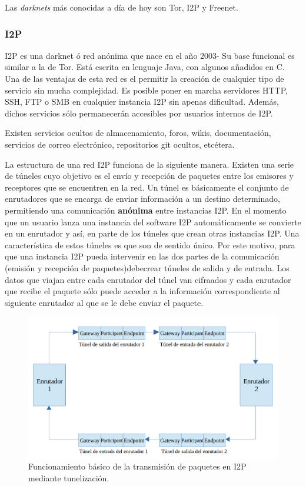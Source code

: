 Las \textit{darknets} más conocidas a día de hoy son Tor, I2P y Freenet.

\subsubsection {I2P}

I2P es una darknet ó red anónima que nace en el año 2003- Su base funcional es similar a la de Tor. Está escrita en lenguaje Java, con algunos añadidos en C. ~\cite{article:i2p}
Una de las ventajas de esta red es el permitir la creación de cualquier tipo de servicio sin mucha complejidad. Es posible poner en marcha servidores HTTP, SSH, FTP o SMB en cualquier instancia I2P sin apenas dificultad. Además, dichos servicios sólo permanecerán accesibles por usuarios internos de I2P.

Existen servicios ocultos de almacenamiento, foros, wikis, documentación, servicios de correo electrónico, repositorios git ocultos, etcétera.

La estructura de una red I2P funciona de la siguiente manera.
Existen una serie de túneles cuyo objetivo es el envío y recepción de paquetes entre los emisores y receptores que se encuentren en la red. Un túnel es básicamente el conjunto de enrutadores que se encarga de enviar información a un destino determinado, permitiendo una comunicación \textbf{anónima} entre instancias I2P.
En el momento que un usuario lanza una instancia del software I2P automáticamente se convierte en un enrutador y así, en parte de los túneles que crean otras instancias I2P.
Una característica de estos túneles es que son de sentido único. Por este motivo, para que una instancia I2P pueda intervenir en las dos partes de la comunicación (emisión y recepción de paquetes)debecrear túneles de salida y de entrada. Los datos que viajan entre cada enrutador del túnel van cifraados y cada enrutador que recibe el paquete sólo puede acceder a la información correspondiente al siguiente enrutador al que se le debe enviar el paquete.

	\begin{figure}[h]
		\centerline{
			\mbox{\includegraphics[width=5.00in]{images/tunnel_i2p.png}}
		}
		\caption{Funcionamiento básico de la transmisión de paquetes en I2P mediante tunelización.}
		\label{fig:I2PTunneling}
	\end{figure}



